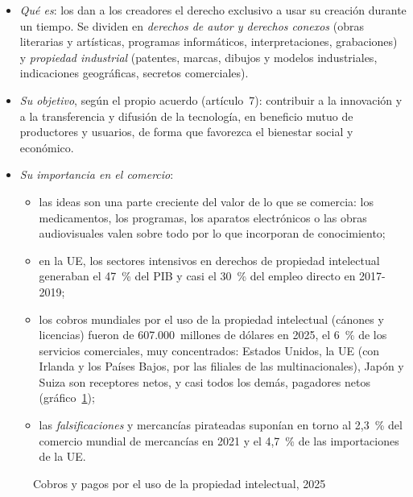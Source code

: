 \documentclass[11pt]{article}
\begin{document}
\begin{itemize}
\item \emph{Qué es}: los  dan a los creadores el derecho exclusivo a usar su creación durante un tiempo. Se dividen en \emph{derechos de autor y derechos conexos} (obras literarias y artísticas, programas informáticos, interpretaciones, grabaciones) y \emph{propiedad industrial} (patentes, marcas, dibujos y modelos industriales, indicaciones geográficas, secretos comerciales).
\item \emph{Su objetivo}, según el propio acuerdo (artículo~7): contribuir a la innovación y a la transferencia y difusión de la tecnología, en beneficio mutuo de productores y usuarios, de forma que favorezca el bienestar social y económico\nocite{OMC1994ADPIC}.
\item \emph{Su importancia en el comercio}:
  \begin{itemize}
  \item las ideas son una parte creciente del valor de lo que se comercia: los medicamentos, los programas, los aparatos electrónicos o las obras audiovisuales valen sobre todo por lo que incorporan de conocimiento;
  \item en la UE, los sectores intensivos en derechos de propiedad intelectual generaban el 47~\% del PIB y casi el 30~\% del empleo directo en 2017-2019\nocite{EPOEUIPO2022};
  \item los cobros mundiales por el uso de la propiedad intelectual (cánones y licencias) fueron de 607.000~millones de dólares en 2025, el 6~\% de los servicios comerciales, muy concentrados: Estados Unidos, la UE (con Irlanda y los Países Bajos, por las filiales de las multinacionales), Japón y Suiza son receptores netos, y casi todos los demás, pagadores netos (gráfico~\ref{fig:pi})\nocite{BM2026WDI};
  \item las \emph{falsificaciones} y mercancías pirateadas suponían en torno al 2,3~\% del comercio mundial de mercancías en 2021 y el 4,7~\% de las importaciones de la UE\nocite{OCDEEUIPO2025Falsificaciones}.
  \end{itemize}
\end{itemize}

\begin{figure}[H]
\centering
\caption{Cobros y pagos por el uso de la propiedad intelectual, 2025}\label{fig:pi}
\end{figure}
\end{document}
